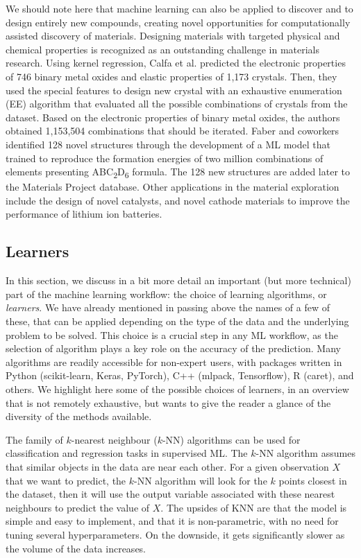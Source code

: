 \documentclass[aip,apm,amsmath,amssymb,reprint]{revtex4-2}
\begin{document}
We should note here that machine learning can also be applied to discover and to design entirely new compounds, creating novel opportunities for computationally assisted discovery of materials. Designing materials with targeted physical and chemical properties is recognized as an outstanding challenge in materials research. Using kernel regression, Calfa et al. predicted the electronic properties of 746 binary metal oxides and elastic properties of 1,173 crystals.\cite{Calfa2016} Then, they used the special features to design new crystal with an exhaustive enumeration (EE) algorithm that evaluated all the possible combinations of crystals from the dataset. Based on the electronic properties of binary metal oxides, the authors obtained 1,153,504 combinations that should be iterated. Faber and coworkers identified 128 novel structures through the development of a ML model that trained to reproduce the formation energies of two million combinations of elements presenting ABC\textsubscript{2}D\textsubscript{6} formula. The 128 new structures are added later to the Materials Project database.\cite{Faber2016} Other applications in the material exploration include the design of novel catalysts,\cite{Goldsmith2018} and novel cathode materials to improve the performance of lithium ion batteries.\cite{Allam2018}


\subsection{Learners}

In this section, we discuss in a bit more detail an important (but more technical) part of the machine learning workflow: the choice of learning algorithms, or \emph{learners}. We have already mentioned in passing above the names of a few of these, that can be applied depending on the type of the data and the underlying problem to be solved. This choice is a crucial step in any ML workflow, as the selection of algorithm plays a key role on the accuracy of the prediction.\cite{Frontera2011} Many algorithms are readily accessible for non-expert users, with packages written in Python (scikit-learn, Keras, PyTorch), C++ (mlpack, Tensorflow), R (caret), and others. We highlight here some of the possible choices of learners, in an overview that is not remotely exhaustive, but wants to give the reader a glance of the diversity of the methods available.

The family of $k$-nearest neighbour ($k$-NN) algorithms can be used for classification and regression tasks in supervised ML. The $k$-NN algorithm assumes that similar objects in the data are near each other. For a given observation $X$ that we want to predict, the $k$-NN algorithm will look for the $k$ points closest in the dataset, then it will use the output variable associated with these nearest neighbours to predict the value of $X$. The upsides of KNN are that the model is simple and easy to implement, and that it is non-parametric, with no need for tuning several hyperparameters. On the downside, it gets significantly slower as the volume of the data increases.
\end{document}
